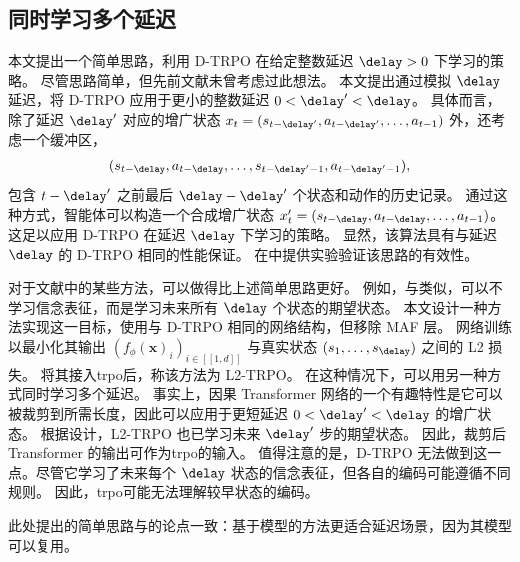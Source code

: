 \subsection{同时学习多个延迟}
\label{subsec:multi_delay_once_belief}
本文提出一个简单思路，利用 D-TRPO 在给定整数延迟 $\delay>0$ 下学习的策略。
尽管思路简单，但先前文献未曾考虑过此想法。
本文提出通过模拟 $\delay$ 延迟，将 D-TRPO 应用于更小的整数延迟 $0<\delay'<\delay$。
具体而言，除了延迟 $\delay'$ 对应的增广状态 $x_t=(s_{t-\delay'},a_{t-\delay'},\dots,a_{t-1})$ 外，还考虑一个缓冲区，
\begin{align*}
    (s_{t-\delay},a_{t-\delay},\dots,s_{t-\delay'-1},a_{t-\delay'-1}),
\end{align*}
包含 $t-\delay'$ 之前最后 $\delay-\delay'$ 个状态和动作的历史记录。
通过这种方式，智能体可以构造一个合成增广状态 $x_t'=(s_{t-\delay},a_{t-\delay},\dots,a_{t-1})$。
这足以应用 D-TRPO 在延迟 $\delay$ 下学习的策略。
显然，该算法具有与延迟 $\delay$ 的 D-TRPO 相同的性能保证。
在中提供实验验证该思路的有效性。

对于文献中的某些方法，可以做得比上述简单思路更好。
例如，与\cite{firoiu2018human}类似，可以不学习信念表征，而是学习未来所有 $\delay$ 个状态的期望状态。
本文设计一种方法实现这一目标，使用与 D-TRPO 相同的网络结构，但移除 MAF 层。
网络训练以最小化其输出 $(f_\phi(\textbf{x})_i)_{i\in[\![1, d]\!]}$ 与真实状态 $(s_1,\dots,s_\delay)$ 之间的 L2 损失。
将其接入\gls{trpo}后，称该方法为 L2-TRPO。
在这种情况下，可以用另一种方式同时学习多个延迟。
事实上，因果 Transformer 网络的一个有趣特性是它可以被裁剪到所需长度，因此可以应用于更短延迟 $0<\delay'<\delay$ 的增广状态。
根据设计，L2-TRPO 也已学习未来 $\delay'$ 步的期望状态。
因此，裁剪后 Transformer 的输出可作为\gls{trpo}的输入。
值得注意的是，D-TRPO 无法做到这一点。尽管它学习了未来每个 $\delay$ 状态的信念表征，但各自的编码可能遵循不同规则。
因此，\gls{trpo}可能无法理解较早状态的编码。

此处提出的简单思路与\cite{chen2021delay}的论点一致：基于模型的方法更适合延迟场景，因为其模型可以复用。


